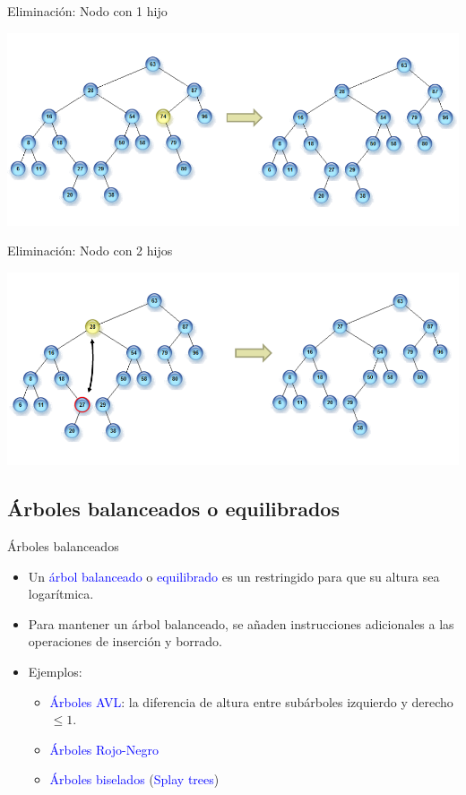 \documentclass[handout]{beamer} %
\newcommand{\blue}[1]{\textcolor{blue}{#1}}
\newcommand{\redb}[1]{{\color{red!70!black}{#1}}}
\begin{document}
\begin{frame}{Eliminación: Nodo con 1 hijo}
    \begin{center}
        \includegraphics[width=\textwidth]{./image/cap3/BST-delete-1child}
    \end{center}
\end{frame}

\begin{frame}{Eliminación: Nodo con 2 hijos}
    \begin{center}
        \includegraphics[width=\textwidth]{./image/cap3/BST-delete-2child}
    \end{center}
\end{frame}

\subsection{Árboles balanceados o equilibrados}

\begin{frame}{Árboles balanceados}
    \begin{itemize}
        \item<1-> Un \blue{árbol balanceado} o \blue{equilibrado} es un \redb{árbol binario de búsqueda} restringido para que su altura sea logarítmica.
        \item<2-> Para mantener un árbol balanceado, se añaden instrucciones adicionales a las operaciones de inserción y borrado.
        \item<3-> Ejemplos:
        \begin{itemize}
            \item \blue{Árboles AVL}: la diferencia de altura entre subárboles izquierdo y derecho $\leq 1$.
            \item \blue{Árboles Rojo-Negro}
            \item \blue{Árboles biselados} (\blue{Splay trees})
        \end{itemize}
    \end{itemize}
\end{frame}
\end{document}
